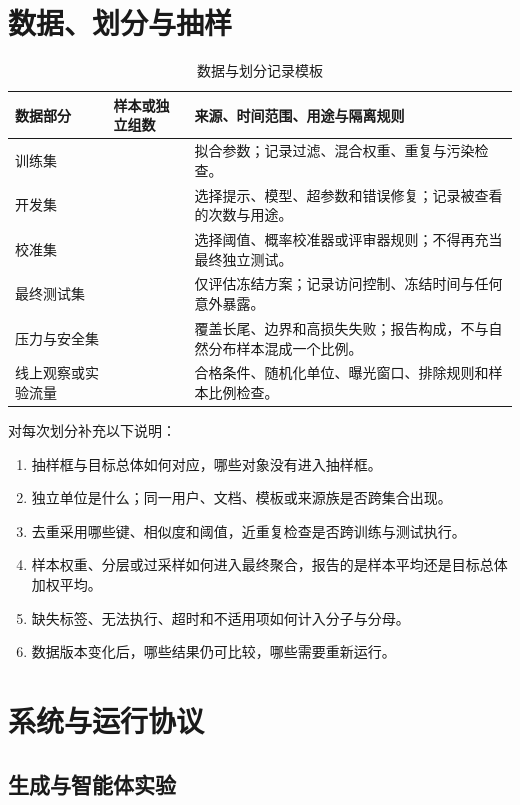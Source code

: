 \documentclass[../textbook.tex]{subfiles}
\begin{document}
\section{数据、划分与抽样}

\begin{table}[htbp]
\centering
\caption{数据与划分记录模板}\label{tab:appendix-data-splits}
\begin{tabularx}{\linewidth}{p{.21\linewidth}p{.20\linewidth}X}
\toprule
数据部分 & 样本或独立组数 & 来源、时间范围、用途与隔离规则\\\midrule
训练集 &  & 拟合参数；记录过滤、混合权重、重复与污染检查。\\
开发集 &  & 选择提示、模型、超参数和错误修复；记录被查看的次数与用途。\\
校准集 &  & 选择阈值、概率校准器或评审器规则；不得再充当最终独立测试。\\
最终测试集 &  & 仅评估冻结方案；记录访问控制、冻结时间与任何意外暴露。\\
压力与安全集 &  & 覆盖长尾、边界和高损失失败；报告构成，不与自然分布样本混成一个比例。\\
线上观察或实验流量 &  & 合格条件、随机化单位、曝光窗口、排除规则和样本比例检查。\\
\bottomrule
\end{tabularx}
\end{table}

对每次划分补充以下说明：
\begin{enumerate}
 \item 抽样框与目标总体如何对应，哪些对象没有进入抽样框。
 \item 独立单位是什么；同一用户、文档、模板或来源族是否跨集合出现。
 \item 去重采用哪些键、相似度和阈值，近重复检查是否跨训练与测试执行。
 \item 样本权重、分层或过采样如何进入最终聚合，报告的是样本平均还是目标总体加权平均。
 \item 缺失标签、无法执行、超时和不适用项如何计入分子与分母。
 \item 数据版本变化后，哪些结果仍可比较，哪些需要重新运行。
\end{enumerate}

\section{系统与运行协议}

\subsection{生成与智能体实验}
\end{document}
